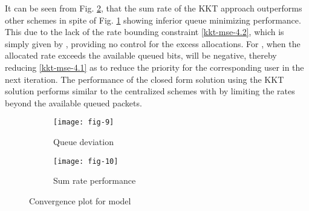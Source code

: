 It can be seen from Fig. \ref{fig-d-3.2}, that the sum rate of the  \ac{KKT} approach outperforms other schemes in spite of Fig. \ref{fig-d-3.1} showing inferior queue minimizing performance. This due to the lack of the rate bounding constraint \eqref{kkt-mse-4.2}, which is simply given by , providing no control for the excess allocations. For , when the allocated rate exceeds the available queued bits,  will be negative, thereby reducing \eqref{kkt-mse-4.1} as  to reduce the priority for the corresponding user in the next iteration. The performance of the closed form solution using the \ac{KKT} solution performs similar to the centralized schemes with  by limiting the rates beyond the available queued packets.
\begin{figure*}
\centering
\begin{subfigure}{0.49\textwidth}
\texttt{[image: fig-9]}
\caption{Queue deviation}
\label{fig-d-3.1}
\end{subfigure}
\hfill
\begin{subfigure}{0.49\textwidth}
\texttt{[image: fig-10]}
\caption{Sum rate performance}
\label{fig-d-3.2}
\end{subfigure}
\caption{Convergence plot for  model}
\label{fig-d-3}
\end{figure*}
